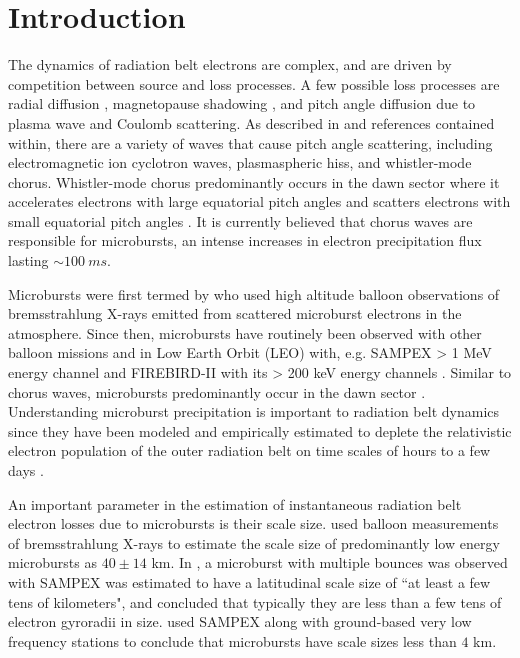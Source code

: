 \documentclass[draft,linenumbers]{agujournal}
\begin{document}
\section{Introduction}\label{Intro}
The dynamics of radiation belt electrons are complex, and are driven by competition between source and loss processes. A few possible loss processes are radial diffusion \citep{Shprits2004}, magnetopause shadowing \citep{Ukhorskiy2006}, and pitch angle diffusion \citep{Selesnick2003, Abel1998_1} due to plasma wave and Coulomb scattering. As described in \citep{Millan2007, Thorne2010} and references contained within, there are a variety of waves that cause pitch angle scattering, including electromagnetic ion cyclotron waves, plasmaspheric hiss, and whistler-mode chorus. Whistler-mode chorus predominantly occurs in the dawn sector \citep{Li2009} where it accelerates electrons with large equatorial pitch angles and scatters electrons with small equatorial pitch angles \citep{Horne2003}. It is currently believed that chorus waves are responsible for microbursts, an intense increases in electron precipitation flux lasting $\sim100 \ ms$. 

Microbursts were first termed by \citet{Anderson1964} who used high altitude balloon observations of bremsstrahlung X-rays emitted from scattered microburst electrons in the atmosphere. Since then, microbursts have routinely been observed with other balloon missions \citep{Parks1967, Woodger2015, Anderson2017} and in Low Earth Orbit (LEO) with, e.g. SAMPEX > 1 MeV energy channel \citep{Nakamura1995, Nakamura2000, Blake1996, Lorentzen2001a, Lorentzen2001b, O'Brien2003, O'Brien2004, Blum2015} and FIREBIRD-II with its > 200 keV energy channels \citep{Crew2016}. Similar to chorus waves, microbursts predominantly occur in the dawn sector \citep{Lorentzen2001b}. Understanding microburst precipitation is important to radiation belt dynamics since they have been modeled and empirically estimated to deplete the relativistic electron population of the outer radiation belt on time scales of hours to a few days \citep{O'Brien2004, Thorne2005, Shprits2007}. 

An important parameter in the estimation of instantaneous radiation belt electron losses due to microbursts is their scale size. \citet{Parks1967} used balloon measurements of bremsstrahlung X-rays to estimate the scale size of predominantly low energy microbursts as $40 \pm 14$ km. In \citet{Blake1996}, a microburst with multiple bounces was observed with SAMPEX was estimated to have a latitudinal scale size of ``at least a few tens of kilometers", and concluded that typically they are less than a few tens of electron gyroradii in size. \citet{Dietrich2010} used SAMPEX along with ground-based very low frequency stations to conclude that microbursts have scale sizes less than $4$ km.
\end{document}
